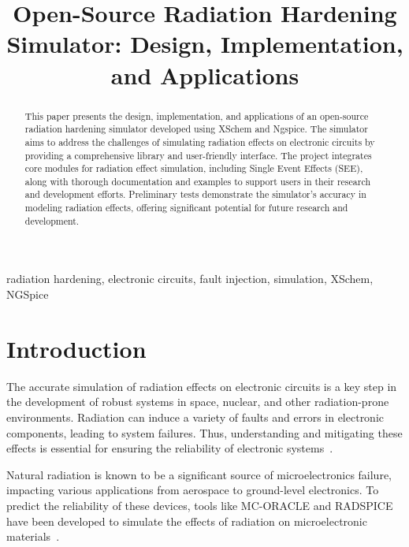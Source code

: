 \documentclass[conference]{IEEEtran}
\begin{document}
    \title{Open-Source Radiation Hardening Simulator: Design, Implementation, and Applications}

    \author{
    }

    \maketitle

    \begin{abstract}
        This paper presents the design, implementation, and applications of an open-source radiation hardening simulator developed using XSchem and Ngspice.
        The simulator aims to address the challenges of simulating radiation effects on electronic circuits by providing a comprehensive library and user-friendly interface.
        The project integrates core modules for radiation effect simulation, including Single Event Effects (SEE), along with thorough documentation and examples to support users in their research and development efforts.
        Preliminary tests demonstrate the simulator's accuracy in modeling radiation effects, offering significant potential for future research and development.
    \end{abstract}

    \begin{IEEEkeywords}
        radiation hardening, electronic circuits, fault injection, simulation, XSchem, NGSpice
    \end{IEEEkeywords}


    \section{Introduction}\label{sec:introduction}
    The accurate simulation of radiation effects on electronic circuits is a key step in the development of robust systems in space, nuclear, and other radiation-prone environments.
    Radiation can induce a variety of faults and errors in electronic components, leading to system failures.
    Thus, understanding and mitigating these effects is essential for ensuring the reliability of electronic systems~\cite{Wrobel2011, Florian1986}.

    Natural radiation is known to be a significant source of microelectronics failure, impacting various applications from aerospace to ground-level electronics.
    To predict the reliability of these devices, tools like MC-ORACLE and RADSPICE have been developed to simulate the effects of radiation on microelectronic materials~\cite{Wrobel2011, Florian1986}.
\end{document}
